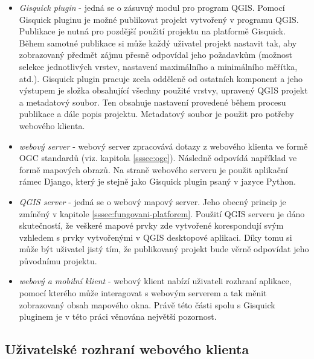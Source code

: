 \begin{itemize}
\item\textit{Gisquick plugin} - jedná se o zásuvný modul pro
program QGIS. Pomocí Gisquick pluginu je možné publikovat projekt vytvořený v programu QGIS. Publikace je nutná pro pozdější použití projektu na platformě Gisquick. Během samotné publikace si může každý
uživatel projekt nastavit tak, aby zobrazovaný předmět zájmu
přesně odpovídal jeho požadavkům (možnost selekce jednotlivých
vrstev, nastavení maximálního a minimálního měřítka,
atd.). Gisquick plugin pracuje zcela odděleně od ostatních
komponent a jeho výstupem je složka obsahující všechny použité
vrstvy, upravený QGIS projekt a metadatový soubor. Ten
obsahuje nastavení provedené během procesu publikace a dále popis
projektu. Metadatový soubor je použit pro potřeby webového klienta.
\item\textit{webový server} - webový server zpracovává
dotazy z webového klienta ve formě OGC standardů (viz. kapitola
\ref{sssec:ogc}). Následně odpovídá například ve formě mapových
obrazů. Na straně webového serveru je použit aplikační rámec Django,
který je stejně jako Gisquick plugin psaný v jazyce Python.
\item\textit{QGIS server} - jedná se o webový mapový server. Jeho obecný princip je zmíněný v kapitole \ref{sssec:fungovani-platforem}. Použití
QGIS serveru je dáno skutečností, že veškeré mapové prvky
zde vytvořené korespondují svým vzhledem s prvky vytvořenými
v QGIS desktopové aplikaci. Díky tomu si může být uživatel
jistý tím, že publikovaný projekt bude věrně odpovídat jeho
původnímu projektu.
\item\textit{webový a mobilní klient} - webový klient nabízí uživateli
rozhraní aplikace, pomocí kterého může interagovat s webovým 
serverem a tak
měnit zobrazovaný obsah mapového okna. Právě této části spolu s Gisquick
pluginem je v této práci věnována největší pozornost.
\end{itemize}

\subsection{Uživatelské rozhraní webového klienta}

